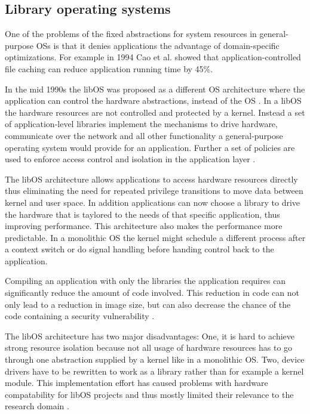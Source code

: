 \documentclass[10pt,twocolumn,a4paper]{article}
\begin{document}
  \subsection{Library operating systems}\label{sec:libOS}
    One of the problems of the fixed abstractions for system resources in general-purpose OSs
    is that it denies applications the advantage of domain-specific optimizations.
    For example in 1994 Cao et al. \cite{cao94} showed that application-controlled file caching
    can reduce application running time by 45\%.

    In the mid 1990s the libOS was proposed as a different OS architecture
    where the application can control the hardware abstractions, instead of the OS \cite{engler95}.
    In a libOS the hardware resources are not controlled and protected by a kernel.
    Instead a set of application-level libraries implement the mechanisms to drive hardware,
    communicate over the network and all other functionality a general-purpose 
    operating system would provide for an application.
    Further a set of policies are used to enforce access control and isolation in the
    application layer \cite{madhavapeddy13-2}.
    
    The libOS architecture allows applications to access hardware resources directly
    thus eliminating the need for repeated privilege transitions to move data
    between kernel and user space.
    In addition applications can now choose a library to drive the hardware that is
    taylored to the needs of that specific application, thus improving performance.
    This architecture also makes the performance more predictable.
    In a monolithic OS the kernel might schedule a different process after a
    context switch or do signal handling before handing control back to the application.

    Compiling an application with only the libraries the application requires
    can significantly reduce the amount of code involved.
    This reduction in code can not only lead to a reduction in image size, 
    but can also decrease the chance of the code containing a 
    security vulnerability \cite{madhavapeddy13}.

    The libOS architecture has two major disadvantages:   
    One, it is hard to achieve strong resource isolation because not all
    usage of hardware resources has to go through one abstraction supplied by
    a kernel like in a monolithic OS.
    Two, device drivers have to be rewritten to work as a library rather than
    for example a kernel module.
    This implementation effort has caused problems with hardware compatability
    for libOS projects and thus mostly limited their relevance to the
    research domain \cite{madhavapeddy13, raza19}.
\end{document}
